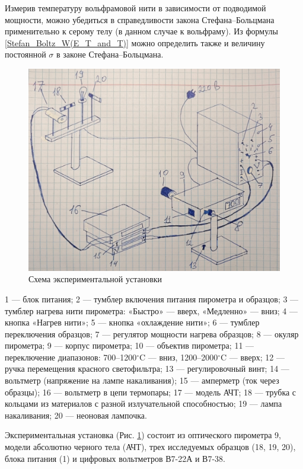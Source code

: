  	Измерив температуру вольфрамовой нити в зависимости от подводимой мощности, можно убедиться в справедливости закона Стефана–Больцмана применительно к серому телу (в данном случае к вольфраму). Из формулы \eqref{Stefan_Boltz_W(E_T_and_T)} можно определить также и величину постоянной $\sigma$ в законе Стефана–Больцмана.


	
	\newpage
	\begin{figure}[h!]
		\centering
		\includegraphics[width=\linewidth]{Pictures/Scheme.jpg}
		\caption{Схема экспериментальной установки}
		\label{Stefan_Boltz_Scheme}
	\end{figure}

	1 — блок питания; 2 — тумблер включения питания пирометра и образцов; 3 — тумблер нагрева нити пирометра: «Быстро» — вверх, «Медленно» — вниз; 4 — кнопка «Нагрев нити»; 5 — кнопка «охлаждение нити»; 6 — тумблер переключения образцов; 7 — регулятор мощности нагрева образцов; 8 — окуляр пирометра; 9 — корпус пирометра; 10 — объектив пирометра; 11 — переключение диапазонов: 700–1200$^\circ$C — вниз, 1200–2000$^\circ$C — вверх; 12 — ручка перемещения красного светофильтра; 13 — регулировочный винт; 14 — вольтметр (напряжение на лампе накаливания); 15 — амперметр (ток через образцы); 16 — вольтметр в цепи термопары; 17 — модель АЧТ; 18 — трубка с кольцами из материалов с разной излучательной способностью; 19 — лампа накаливания; 20 — неоновая лампочка.
	
	Экспериментальная установка (Рис. \ref{Stefan_Boltz_Scheme}) состоит из оптического пирометра 9, модели абсолютно черного тела (АЧТ), трех исследуемых образцов (18, 19, 20), блока питания (1) и цифровых вольтметров В7-22А и В7-38.
	
